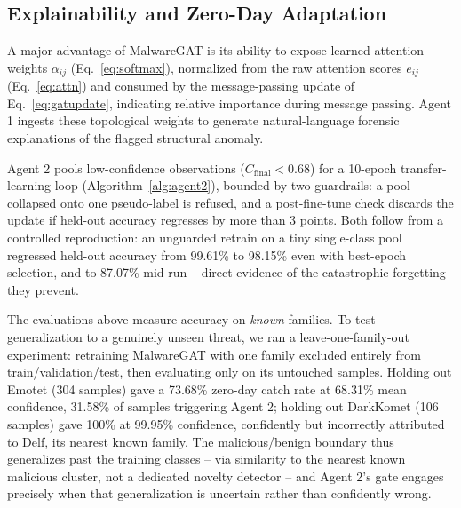 \documentclass[conference]{IEEEtran}
\newcommand{\RetrainPreAcc}{99.61\%}   %
\newcommand{\RetrainPostAcc}{98.15\%}  %
\newcommand{\RetrainMidAcc}{87.07\%}   %
\newcommand{\ZDOneFamily}{Emotet}
\newcommand{\ZDOneN}{304}
\newcommand{\ZDOneCatch}{73.68\%}
\newcommand{\ZDOneConf}{68.31\%}
\newcommand{\ZDOneTrigger}{31.58\%}
\newcommand{\ZDTwoFamily}{DarkKomet}
\newcommand{\ZDTwoN}{106}
\newcommand{\ZDTwoCatch}{100\%}
\newcommand{\ZDTwoConf}{99.95\%}
\newcommand{\ZDTwoNearest}{Delf}
\newcommand{\GateTau}{0.68}
\begin{document}
\subsection{Explainability and Zero-Day Adaptation}
A major advantage of MalwareGAT is its ability to expose learned attention weights $\alpha_{ij}$ (Eq.~\ref{eq:softmax}), normalized from the raw attention scores $e_{ij}$ (Eq.~\ref{eq:attn}) and consumed by the message-passing update of Eq.~\ref{eq:gatupdate}, indicating relative importance during message passing. Agent 1 ingests these topological weights to generate natural-language forensic explanations of the flagged structural anomaly.

Agent 2 pools low-confidence observations ($C_{\text{final}} < \GateTau$) for a 10-epoch transfer-learning loop (Algorithm~\ref{alg:agent2}), bounded by two guardrails: a pool collapsed onto one pseudo-label is refused, and a post-fine-tune check discards the update if held-out accuracy regresses by more than 3 points. Both follow from a controlled reproduction: an unguarded retrain on a tiny single-class pool regressed held-out accuracy from \RetrainPreAcc{} to \RetrainPostAcc{} even with best-epoch selection, and to \RetrainMidAcc{} mid-run -- direct evidence of the catastrophic forgetting they prevent.

The evaluations above measure accuracy on \emph{known} families. To test generalization to a genuinely unseen threat, we ran a leave-one-family-out experiment: retraining MalwareGAT with one family excluded entirely from train/validation/test, then evaluating only on its untouched samples. Holding out \ZDOneFamily{} (\ZDOneN{} samples) gave a \ZDOneCatch{} zero-day catch rate at \ZDOneConf{} mean confidence, \ZDOneTrigger{} of samples triggering Agent 2; holding out \ZDTwoFamily{} (\ZDTwoN{} samples) gave \ZDTwoCatch{} at \ZDTwoConf{} confidence, confidently but incorrectly attributed to \ZDTwoNearest{}, its nearest known family. The malicious/benign boundary thus generalizes past the training classes -- via similarity to the nearest known malicious cluster, not a dedicated novelty detector -- and Agent 2's gate engages precisely when that generalization is uncertain rather than confidently wrong.
\end{document}
